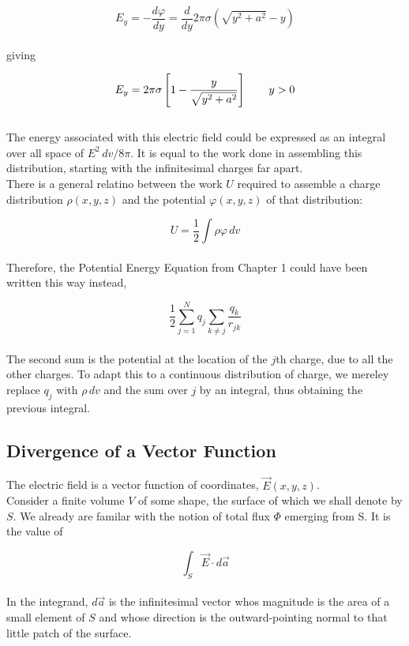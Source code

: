 \documentclass[svgnames]{article}
\begin{document}
\[ E_y = -\frac{d\varphi}{dy} = \frac{d}{dy} 2\pi \sigma (\sqrt{y^2 + a^2} - y) \] \\

giving 

\[ E_y = 2\pi \sigma \left[1 - \frac{y}{\sqrt{y^2+a^2}} \right] \hspace{20px} y > 0 \]\\

The energy associated with this electric field could be expressed as an integral over all space of $E^2 \, dv / 8\pi$. It is equal to the work done in assembling this distribution, starting with the infinitesimal charges far apart. \\ 

There is a general relatino between the work $U$ required to assemble a charge distribution $\rho (x, y, z)$ and the potential $\varphi(x, y, z)$ of that distribution: 

\[ U = \frac{1}{2} \int \rho \varphi \, dv \] \\ 

Therefore, the Potential Energy Equation from Chapter 1 could have been written this way instead, 

\[ \frac{1}{2} \sum_{j=1}^N q_j \sum_{k\neq j} \frac{q_k}{r_{jk}} \] \\

The second sum is the potential at the location of the $j$th charge, due to all the other charges. To adapt this to a continuous distribution of charge, we mereley replace $q_j$ with $\rho \, dv$ and the sum over $j$ by an integral, thus obtaining the previous integral. \\

\subsection{Divergence of a Vector Function} 

The electric field is a vector function of coordinates, $\vec{E}(x, y, z)$. \\ 

Consider a finite volume $V$ of some shape, the surface of which we shall denote by $S$. We already are familar with the notion of total flux $\Phi$ emerging from S. It is the value of 

\[ \int_S \vec{E} \cdot d\vec{a} \] \\

In the integrand, $d\vec{a}$ is the infinitesimal vector whos magnitude is the area of a small element of $S$ and whose direction is the outward-pointing normal to that little patch of the surface. \\
\end{document}
